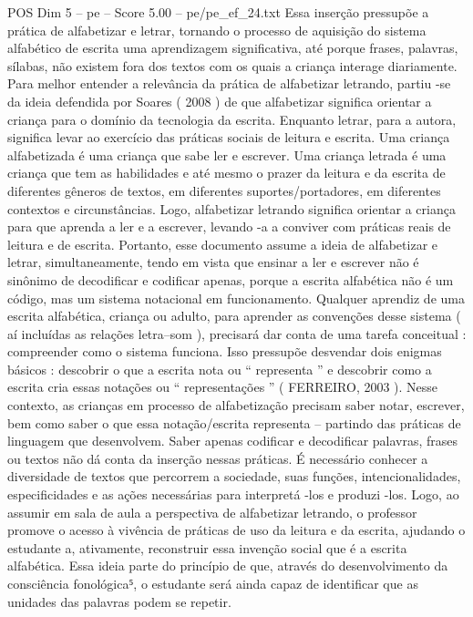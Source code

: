 \begin{textsample}{POS Dim 5 – pe – Score 5.00 – pe/pe\_ef\_24.txt}
Essa inserção pressupõe a prática de alfabetizar e letrar, tornando o processo de aquisição do sistema alfabético de escrita uma aprendizagem significativa, até porque frases, palavras, sílabas, não existem fora dos textos com os quais a criança interage diariamente.
Para melhor entender a relevância da prática de alfabetizar letrando, partiu -se da ideia defendida por Soares ( 2008 ) de que alfabetizar significa orientar a criança para o domínio da tecnologia da escrita.
Enquanto letrar, para a autora, significa levar ao exercício das práticas sociais de leitura e escrita.
Uma criança alfabetizada é uma criança que sabe ler e escrever.
Uma criança letrada é uma criança que tem as habilidades e até mesmo o prazer da leitura e da escrita de diferentes gêneros de textos, em diferentes suportes/portadores, em diferentes contextos e circunstâncias.
Logo, alfabetizar letrando significa orientar a criança para que aprenda a ler e a escrever, levando -a a conviver com práticas reais de leitura e de escrita.
Portanto, esse documento assume a ideia de alfabetizar e letrar, simultaneamente, tendo em vista que ensinar a ler e escrever não é sinônimo de decodificar e codificar apenas, porque a escrita alfabética não é um código, mas um sistema notacional em funcionamento.
Qualquer aprendiz de uma escrita alfabética, criança ou adulto, para aprender as convenções desse sistema ( aí incluídas as relações letra–som ), precisará dar conta de uma tarefa conceitual : compreender como o sistema funciona.
Isso pressupõe desvendar dois enigmas básicos : descobrir o que a escrita nota ou “ representa ” e descobrir como a escrita cria essas notações ou “ representações ” ( FERREIRO, 2003 ).
Nesse contexto, as crianças em processo de alfabetização precisam saber notar, escrever, bem como saber o que essa notação/escrita representa – partindo das práticas de linguagem que desenvolvem.
Saber apenas codificar e decodificar palavras, frases ou textos não dá conta da inserção nessas práticas.
É necessário conhecer a diversidade de textos que percorrem a sociedade, suas funções, intencionalidades, especificidades e as ações necessárias para interpretá -los e produzi -los.
Logo, ao assumir em sala de aula a perspectiva de alfabetizar letrando, o professor promove o acesso à vivência de práticas de uso da leitura e da escrita, ajudando o estudante a, ativamente, reconstruir essa invenção social que é a escrita alfabética.
Essa ideia parte do princípio de que, através do desenvolvimento da consciência fonológica⁵, o estudante será ainda capaz de identificar que as unidades das palavras podem se repetir.

\end{textsample}

